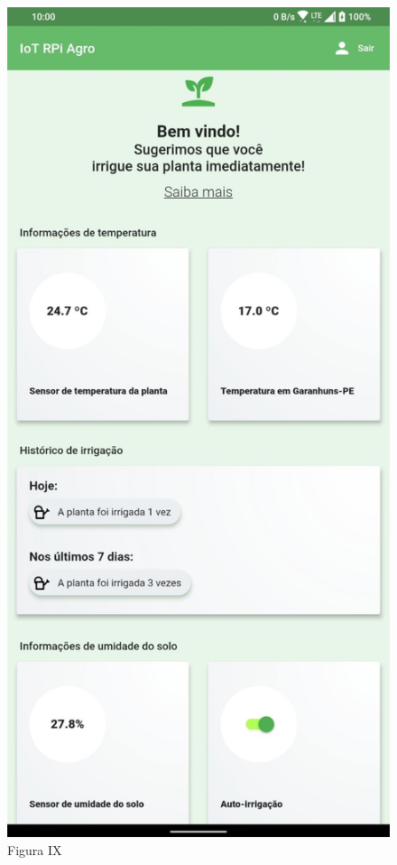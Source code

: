 \documentclass[eso]{bcc}
\begin{document}
\begin{figure}[htbp]
\centerline{\includegraphics[scale=.25]{Figuras/figura-ix.jpg}}
\caption{Figura IX}\label{fig-ix}
\end{figure}
\end{document}
